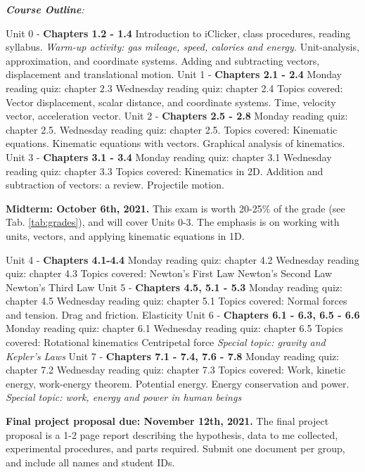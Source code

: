 \documentclass[10pt]{article}
\begin{document}
\textit{\textbf{Course Outline}:}
\begin{outline}[enumerate]
\1 Unit 0 - \textbf{Chapters 1.2 - 1.4}
\2 Introduction to iClicker, class procedures, reading syllabus.
\2 \textit{Warm-up activity: gas mileage, speed, calories and energy.}
\2 Unit-analysis, approximation, and coordinate systems.
\2 Adding and subtracting vectors, displacement and translational motion.
\1 Unit 1 - \textbf{Chapters 2.1 - 2.4}
\2 Monday reading quiz: chapter 2.3
\2 Wednesday reading quiz: chapter 2.4
\2 Topics covered:
\3 Vector displacement, scalar distance, and coordinate systems.
\3 Time, velocity vector, acceleration vector.
\1 Unit 2 - \textbf{Chapters 2.5 - 2.8}
\2 Monday reading quiz: chapter 2.5.
\2 Wednesday reading quiz: chapter 2.5.
\2 Topics covered:
\3 Kinematic equations.
\3 Kinematic equations with vectors.
\3 Graphical analysis of kinematics.
\1 Unit 3 - \textbf{Chapters 3.1 - 3.4}
\2 Monday reading quiz: chapter 3.1
\2 Wednesday reading quiz: chapter 3.3
\2 Topics covered:
\3 Kinematics in 2D.
\3 Addition and subtraction of vectors: a review.
\3 Projectile motion.

\1 \textbf{Midterm: October 6th, 2021.} This exam is worth 20-25\% of the grade (see Tab. \ref{tab:grades}), and will cover Units 0-3.  The emphasis is on working with units, vectors, and applying kinematic equations in 1D. 

\1 Unit 4 - \textbf{Chapters 4.1-4.4}
\2 Monday reading quiz: chapter 4.2
\2 Wednesday reading quiz: chapter 4.3
\2 Topics covered:
\3 Newton's First Law
\3 Newton's Second Law
\3 Newton's Third Law
\1 Unit 5 - \textbf{Chapters 4.5, 5.1 - 5.3}
\2 Monday reading quiz: chapter 4.5
\2 Wednesday reading quiz: chapter 5.1
\2 Topics covered:
\3 Normal forces and tension.
\3 Drag and friction.
\3 Elasticity
\1 Unit 6 - \textbf{Chapters 6.1 - 6.3, 6.5 - 6.6}
\2 Monday reading quiz: chapter 6.1
\2 Wednesday reading quiz: chapter 6.5
\2 Topics covered:
\3 Rotational kinematics
\3 Centripetal force
\3 \textit{Special topic: gravity and Kepler's Laws}
\1 Unit 7 - \textbf{Chapters 7.1 - 7.4, 7.6 - 7.8}
\2 Monday reading quiz: chapter 7.2
\2 Wednesday reading quiz: chapter 7.3
\2 Topics covered:
\3 Work, kinetic energy, work-energy theorem.
\3 Potential energy.
\3 Energy conservation and power.
\3 \textit{Special topic: work, energy and power in human beings}

\1 \textbf{Final project proposal due: November 12th, 2021.}  The final project proposal is a 1-2 page report describing the hypothesis, data to me collected, experimental procedures, and parts required.  Submit one document per group, and include all names and student IDs.


\end{outline}
\end{document}
